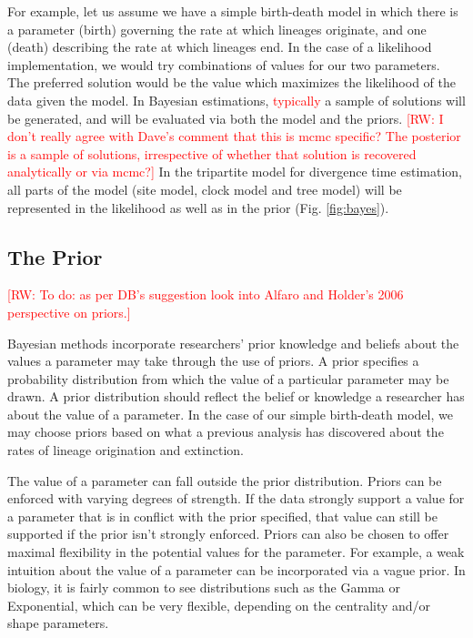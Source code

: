 \documentclass[11pt]{article}
\newcommand{\rw}[1]{{\textcolor{red}{[RW: #1]}}} %
\newcommand{\edit}[1]{{\textcolor{red}{#1}}} %
\begin{document}
For example, let us assume we have a simple birth-death model in which there is a parameter (birth) governing the rate at which lineages originate, and one (death) describing the rate at which lineages end.
In the case of a likelihood implementation, we would try combinations of values for our two parameters. 
The preferred solution would be the value which maximizes the likelihood of the data given the model.
In Bayesian estimations, \edit{typically} a sample of solutions will be generated, and will be evaluated via both the model and the priors. \rw{I don't really agree with Dave's comment that this is mcmc specific? The posterior is a sample of solutions, irrespective of whether that solution is recovered analytically or via mcmc?}
In the tripartite model for divergence time estimation, all parts of the model (site model, clock model and tree model) will be represented in the likelihood as well as in the prior (Fig. \ref{fig:bayes}).


\subsection{The Prior}

\rw{To do: as per DB's suggestion look into Alfaro and Holder's 2006 perspective on priors.}

Bayesian methods incorporate researchers' prior knowledge and beliefs about the values a parameter may take through the use of priors.
A prior specifies a probability distribution from which the value of a particular parameter may be drawn.
A prior distribution should reflect the belief or knowledge a researcher has about the value of a parameter.
In the case of our simple birth-death model, we may choose priors based on what a previous analysis has discovered about the rates of lineage origination and extinction.


The value of a parameter can fall outside the prior distribution.
Priors can be enforced with varying degrees of strength.
If the data strongly support a value for a parameter that is in conflict with the prior specified, that value can still be supported if the prior isn't strongly enforced.
Priors can also be chosen to offer maximal flexibility in the potential values for the parameter.
For example, a weak intuition about the value of a parameter can be incorporated via a vague prior.
In biology, it is fairly common to see distributions such as the Gamma or Exponential, which can be very flexible, depending on the centrality and/or shape parameters.
\end{document}
